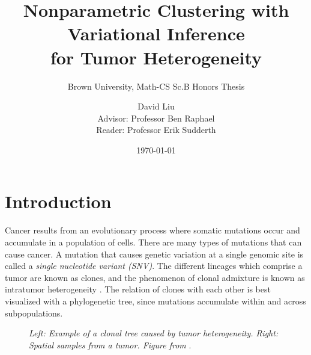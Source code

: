 \documentclass[11pt]{article}
\title{\vspace{2in}Nonparametric Clustering with Variational Inference \\ for Tumor Heterogeneity}
\subtitle{Brown University, Math-CS Sc.B Honors Thesis}
\date{ \vspace{1.0in} \today}
\author{David Liu \vspace{1.5in}\\ Advisor: Professor Ben Raphael \\[20pt] Reader: Professor Erik Sudderth}
\begin{document}
\maketitle
\newpage
\tableofcontents
\singlespacing
\section{Introduction}
Cancer results from an evolutionary process where somatic mutations occur and accumulate in a population of cells. There are many types of mutations that can cause cancer. A mutation that causes genetic variation at a single genomic site is called a \emph{single nucleotide variant (SNV)}. The different lineages which comprise a tumor are known as clones, and the phenomenon of clonal admixture is known as intratumor heterogeneity \cite{Nowell1976}. The relation of clones with each other is best visualized with a phylogenetic tree, since mutations accumulate within and across subpopulations.

\begin{figure}[h]
\par
{}%
\hspace{0.5in}
%
\par
\caption{\emph{Left: Example of a clonal tree caused by tumor heterogeneity. Right: Spatial samples from a tumor. Figure from} \cite{Ancestree}.}
\label{fig:Heterogeneity}
\end{figure}
\end{document}
